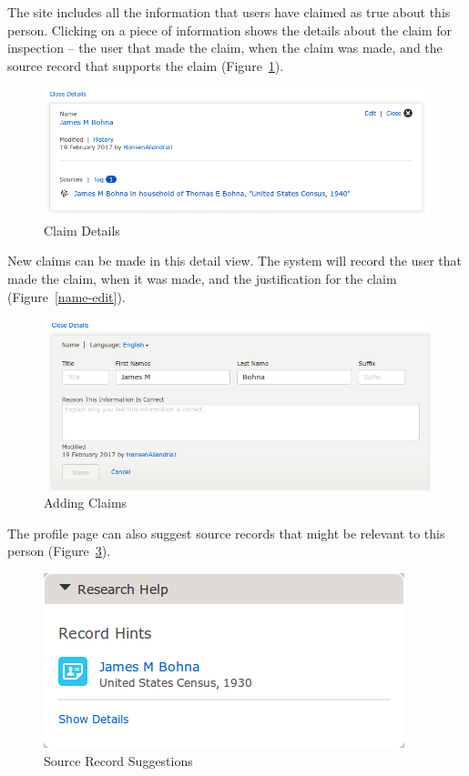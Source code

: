 \documentclass[format=siggraph, review=true]{acmart}
\begin{document}
The site includes all the information that users have claimed as true
about this person. Clicking on a piece of information shows the
details about the claim for inspection -- the user that made the
claim, when the claim was made, and the source record that supports
the claim (Figure~\ref{fig:name-detail}).

\begin{figure}[h]
\includegraphics[width=\columnwidth]{images/familysearch/name-detail.png}
\caption{Claim Details}
\label{fig:name-detail}
\end{figure}

New claims can be made in this detail view. The system will record
the user that made the claim, when it was made, and the justification
for the claim (Figure~\ref{name-edit}).

\begin{figure}[h]
\includegraphics[width=\columnwidth]{images/familysearch/name-edit.png}
\caption{Adding Claims}
\label{fig:name-edit}
\end{figure}

The profile page can also suggest source records that might be
relevant to this person (Figure~\ref{fig:record-hint}).

\begin{figure}[h]
\includegraphics[width=\columnwidth]{images/familysearch/record-hint.png}
\caption{Source Record Suggestions}
\label{fig:record-hint}
\end{figure}
\end{document}
